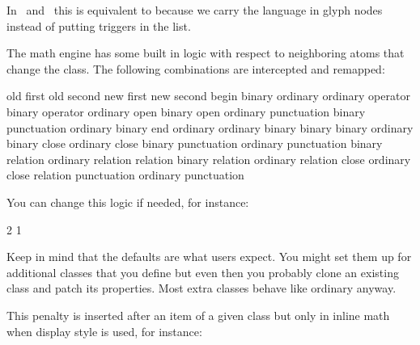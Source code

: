 \stopnewprimitive

\startoldprimitive[title={\prm {setlanguage}}]

In \LUATEX\ and \LUAMETATEX\ this is equivalent to  because we
carry the language in glyph nodes instead of putting triggers in the list.

\stopoldprimitive

\startnewprimitive[title={\prm {setmathatomrule}}]

The math engine has some built in logic with respect to neighboring atoms that
change the class. The following combinations are intercepted and remapped:

\starttabulate[|c|c|c|c|]
\BC old first   \BC old second  \NC new first   \NC new second  \NC \NR
\ML
\NC begin       \NC binary      \NC ordinary    \NC ordinary    \NC \NR
\NC             \NC             \NC             \NC             \NC \NR
\NC operator    \NC binary      \NC operator    \NC ordinary    \NC \NR
\NC open        \NC binary      \NC open        \NC ordinary    \NC \NR
\NC punctuation \NC binary      \NC punctuation \NC ordinary    \NC \NR
\NC             \NC             \NC             \NC             \NC \NR
\NC binary      \NC end         \NC ordinary    \NC ordinary    \NC \NR
\NC binary      \NC binary      \NC binary      \NC ordinary    \NC \NR
\NC binary      \NC close       \NC ordinary    \NC close       \NC \NR
\NC binary      \NC punctuation \NC ordinary    \NC punctuation \NC \NR
\NC binary      \NC relation    \NC ordinary    \NC relation    \NC \NR
\NC             \NC             \NC             \NC             \NC \NR
\NC relation    \NC binary      \NC relation    \NC ordinary    \NC \NR
\NC relation    \NC close       \NC ordinary    \NC close       \NC \NR
\NC relation    \NC punctuation \NC ordinary    \NC punctuation \NC \NR
\stoptabulate

You can change this logic if needed, for instance:

\starttyping
{} 2  1
\stoptyping

Keep in mind that the defaults are what users expect. You might set them up for
additional classes that you define but even then you probably clone an existing
class and patch its properties. Most extra classes behave like ordinary anyway.

\stopnewprimitive

\startnewprimitive[title={\prm {setmathdisplaypostpenalty}}]

This penalty is inserted after an item of a given class but only in inline math
when display style is used, for instance:

